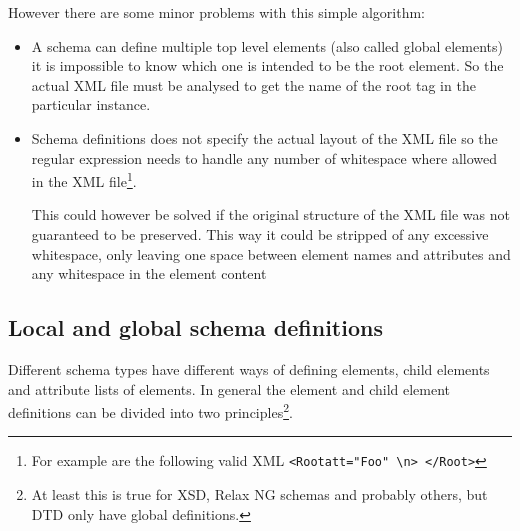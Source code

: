 \documentclass[a4paper, oneside]{memoir}
\theoremstyle{definition}
\begin{document}
  However there are some minor problems with this simple algorithm:

  \begin{itemize}
  \item A schema can define multiple top level elements (also called global
    elements) it is impossible to know which one is intended to be the root
    element. So the actual XML file must be analysed to get the name of the root
    tag in the particular instance.

  \item Schema definitions does not specify the actual layout of the XML file so
    the regular expression needs to handle any number of whitespace where
    allowed in the XML file\footnote{For example are the following valid XML
      \texttt{<Root{\textvisiblespace}att="Foo"\textvisiblespace%
        \textvisiblespace\textbackslash{n}\textvisiblespace>\textvisiblespace%
        </Root\textvisiblespace\textvisiblespace>}}.

    This could however be solved if the original structure of the XML file was
    not guaranteed to be preserved. This way it could be stripped of any
    excessive whitespace, only leaving one space between element names and
    attributes and any whitespace in the element content
  \end{itemize}

\subsection{Local and global schema definitions}
\label{sec:local-global-schema-definitions}
Different schema types have different ways of defining elements, child elements
and attribute lists of elements. In general the element and child element
definitions can be divided into two principles\footnote{At least this is true
  for XSD, Relax NG schemas and probably others, but DTD only have global
  definitions.}.
\end{document}
